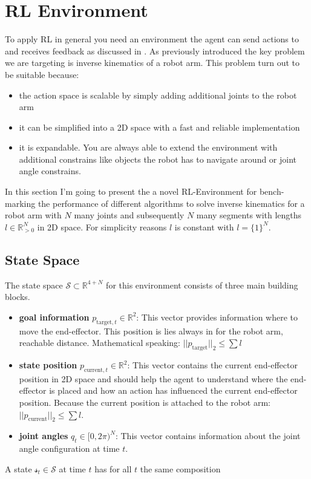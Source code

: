 \section{RL Environment}

To apply RL in general you need an environment the agent can send actions to and receives feedback as discussed in . As previously introduced the key problem we are targeting is inverse kinematics of a robot arm. This problem turn out to be suitable because:
\begin{itemize}
    \item the action space is scalable by simply adding additional joints to the robot arm
    \item it can be simplified into a 2D space with a fast and reliable implementation
    \item it is expandable. You are always able to extend the environment with additional constrains like objects the robot has to navigate around or joint angle constrains.
\end{itemize}

In this section I'm going to present the a novel RL-Environment for bench-marking the performance of different algorithms to solve inverse kinematics for a robot arm with $N$ many joints and subsequently $N$ many segments with lengths $l \in\mathbb{R}_{>0}^N$ in 2D space. For simplicity reasons $l$ is constant with $l = \{ 1 \}^N$.

\subsection{State Space}

The state space $\mathcal{S} \subset \mathbb{R}^{4 + N}$ for this environment consists of three main building blocks. 

\begin{itemize}
    \item \textbf{goal information} $p_{\text{target}, t} \in \mathbb{R}^2$: This vector provides information where to move the end-effector. This position is lies always in for the robot arm, reachable distance. Mathematical speaking: $||p_\text{target}||_2 \leq \sum l$ 
    \item \textbf{state position} $p_{\text{current},t} \in \mathbb{R}^2$: This vector contains the current end-effector position in 2D space and should help the agent to understand where the end-effector is placed and how an action has influenced the current end-effector position. Because the current position is attached to the robot arm: $||p_\text{current}||_2 \leq \sum l$.
    \item \textbf{joint angles} $q_t \in [0, 2\pi)^N$: This vector contains information about the joint angle configuration at time $t$.
\end{itemize}
A state $\mathcal{s}_t \in \mathcal{S}$ at time $t$ has for all $t$ the same composition

